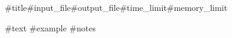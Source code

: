 \begin{problem}{#{title}}{#{input_file}}{#{output_file}}{#{time_limit}}{#{memory_limit}}{}

#{text}
#{example}
#{notes}
\end{problem}
